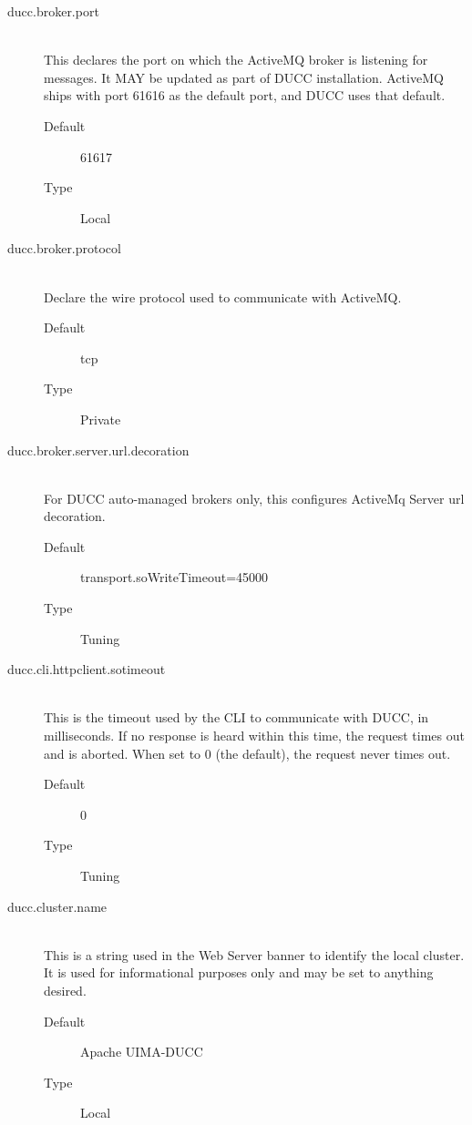 \begin{description}
       \item[ducc.broker.port] \hfill \\
         This declares the port on which the ActiveMQ broker is listening for
         messages. It MAY be updated as part of DUCC installation. ActiveMQ ships with port
         61616 as the default port, and DUCC uses that default.         
         \begin{description}
           \item[Default] 61617              
           \item[Type] Local 
         \end{description}
             

       \item[ducc.broker.protocol] \hfill \\
         Declare the wire protocol used to communicate with ActiveMQ. 
         \begin{description}
           \item[Default] tcp 
           \item[Type] Private 
         \end{description}


       \item[ducc.broker.server.url.decoration] \hfill \\
         For DUCC auto-managed brokers only, this configures ActiveMq Server url decoration.
         
         \begin{description}
           \item[Default] transport.soWriteTimeout=45000
           \item[Type] Tuning
         \end{description} 

       \item[ducc.cli.httpclient.sotimeout] \hfill \\
         This is the timeout used by the CLI to communicate with DUCC, in milliseconds. If no 
         response is heard within this time, the request times out and is aborted. When set to 0 (the 
         default), the request never times out. 
         \begin{description}
           \item[Default] 0 
           \item[Type] Tuning 
          \end{description}

       \item[ducc.cluster.name] \hfill \\
         This is a string used in the Web Server banner to identify the local cluster. It is used
         for informational purposes only and may be set to anything desired.
         \begin{description}
           \item[Default] Apache UIMA-DUCC
           \item[Type] Local 
         \end{description}
          

\end{description}
